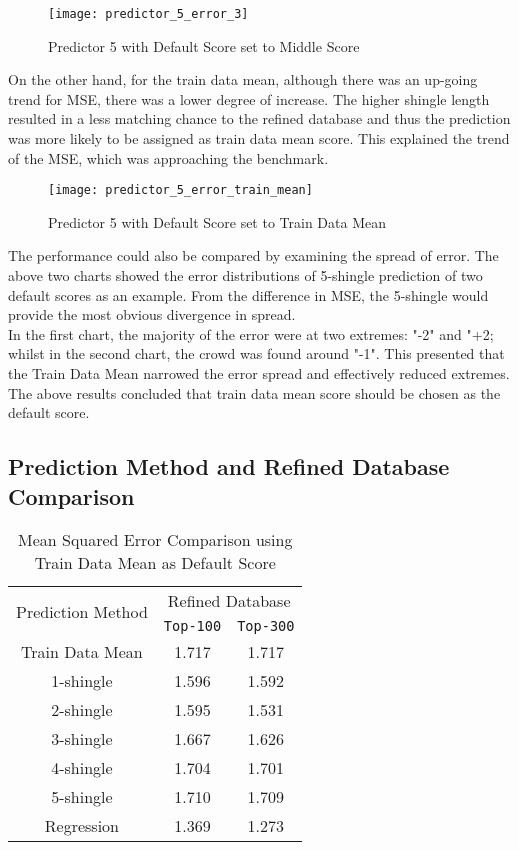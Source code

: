 \begin{figure}[H]
\texttt{[image: predictor\_5\_error\_3]}
\caption{Predictor 5 with Default Score set to Middle Score}
\end{figure}

On the other hand, for the train data mean, although there was an up-going trend for MSE, there was a lower degree of increase.
The higher shingle length resulted in a less matching chance to the refined database and thus the prediction was more likely to be assigned as train data mean score. This explained the trend of the MSE, which was approaching the benchmark.

\begin{figure}[H]
\texttt{[image: predictor\_5\_error\_train\_mean]}
\caption{Predictor 5 with Default Score set to Train Data Mean}
\end{figure}

The performance could also be compared by examining the spread of error. The above two charts showed the error distributions of 5-shingle prediction of two default scores as an example. From the difference in MSE, the 5-shingle would provide the most obvious divergence in spread.\\
In the first chart, the majority of the error were at two extremes: "-2" and "+2; whilst in the second chart, the crowd was found around "-1". This presented that the Train Data Mean narrowed the error spread and effectively reduced extremes.
The above results concluded that train data mean score should be chosen as the default score.




\subsection{Prediction Method and Refined Database Comparison}

\begin{table}[H]
\caption{Mean Squared Error Comparison using Train Data Mean as Default Score}
	\begin{tabular}{ccc}
			\toprule
				\multirow{2}{*}{Prediction Method} &
				\multicolumn{2}{c}{Refined Database}\\
				\cline{2-3}
				& \texttt{Top-100} &  \texttt{Top-300} \\
			\midrule
				Train Data Mean & 1.717 & 1.717 \\
				\hline
				1-shingle & 1.596 & 1.592\\
				2-shingle & 1.595 & 1.531\\
				3-shingle & 1.667 & 1.626\\
				4-shingle & 1.704 & 1.701\\
				5-shingle & 1.710 & 1.709\\
				\hline
				Regression & 1.369 & 1.273\\

			\bottomrule
		\end{tabular}

\end{table}

